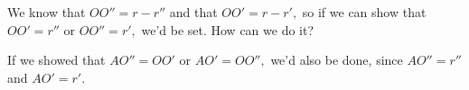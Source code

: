 


















We know that $OO'' = r - r''$ and that $OO' = r - r',$ so if we can show that $OO' = r''$ or $OO'' = r',$ we'd be set. How can we do it?


If we showed that $AO'' = OO'$ or $AO' = OO'',$ we'd also be done, since $AO'' = r''$ and $AO' = r'.$


